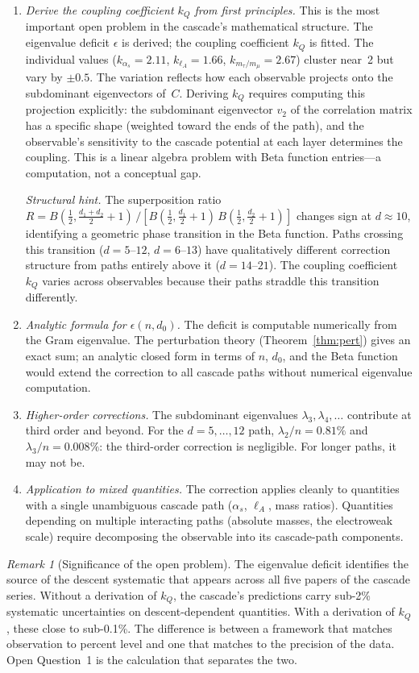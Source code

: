 \documentclass[12pt,a4paper]{article}
\theoremstyle{remark}
\newtheorem*{remark}{Remark}
\begin{document}
\begin{enumerate}[nosep]
\item \emph{Derive the coupling coefficient $k_Q$ from first principles.} This is the most important open problem in the cascade's mathematical structure. The eigenvalue deficit $\epsilon$ is derived; the coupling coefficient $k_Q$ is fitted. The individual values ($k_{\alpha_s} = 2.11$, $k_{\ell_A} = 1.66$, $k_{m_\tau/m_\mu} = 2.67$) cluster near~2 but vary by $\pm 0.5$. The variation reflects how each observable projects onto the subdominant eigenvectors of~$C$. Deriving $k_Q$ requires computing this projection explicitly: the subdominant eigenvector $v_2$ of the correlation matrix has a specific shape (weighted toward the ends of the path), and the observable's sensitivity to the cascade potential at each layer determines the coupling. This is a linear algebra problem with Beta function entries---a computation, not a conceptual gap.

\emph{Structural hint.} The superposition ratio $R = B(\frac{1}{2}, \frac{d_1+d_2}{2}+1)\, / \left[B(\frac{1}{2}, \frac{d_1}{2}+1)\, B(\frac{1}{2}, \frac{d_2}{2}+1)\right]$ changes sign at $d \approx 10$, identifying a geometric phase transition in the Beta function. Paths crossing this transition ($d = 5\text{--}12$, $d = 6\text{--}13$) have qualitatively different correction structure from paths entirely above it ($d = 14\text{--}21$). The coupling coefficient $k_Q$ varies across observables because their paths straddle this transition differently.
\item \emph{Analytic formula for $\epsilon(n, d_0)$.} The deficit is computable numerically from the Gram eigenvalue. The perturbation theory (Theorem~\ref{thm:pert}) gives an exact sum; an analytic closed form in terms of $n$, $d_0$, and the Beta function would extend the correction to all cascade paths without numerical eigenvalue computation.
\item \emph{Higher-order corrections.} The subdominant eigenvalues $\lambda_3, \lambda_4, \ldots$ contribute at third order and beyond. For the $d = 5, \ldots, 12$ path, $\lambda_2/n = 0.81\%$ and $\lambda_3/n = 0.008\%$: the third-order correction is negligible. For longer paths, it may not be.
\item \emph{Application to mixed quantities.} The correction applies cleanly to quantities with a single unambiguous cascade path ($\alpha_s$, $\ell_A$, mass ratios). Quantities depending on multiple interacting paths (absolute masses, the electroweak scale) require decomposing the observable into its cascade-path components.
\end{enumerate}

\begin{remark}[Significance of the open problem]
The eigenvalue deficit identifies the source of the descent systematic that appears across all five papers of the cascade series. Without a derivation of $k_Q$, the cascade's predictions carry sub-2\% systematic uncertainties on descent-dependent quantities. With a derivation of $k_Q$, these close to sub-0.1\%. The difference is between a framework that matches observation to percent level and one that matches to the precision of the data. Open Question~1 is the calculation that separates the two.
\end{remark}
\end{document}

